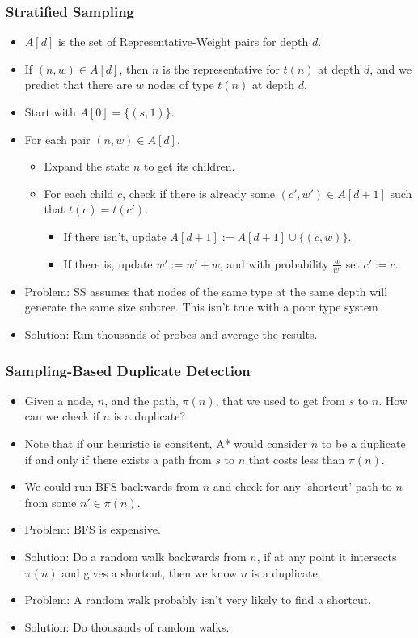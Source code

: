 \documentclass{beamer}
\begin{document}
\begin{frame}
  \frametitle{Stratified Sampling}
  \begin{itemize}
  \item \(A[d]\) is the set of Representative-Weight pairs for depth \(d\).
  \item If \((n,w) \in A[d]\), then \(n\) is the representative for \(t(n)\) at depth \(d\),
    and we predict that there are \(w\) nodes of type \(t(n)\) at depth \(d\).
  \item Start with \(A[0] = \{(s,1)\}\).
  \item For each pair \((n,w) \in A[d]\).
    \begin{itemize}
    \item Expand the state \(n\) to get its children.
    \item For each child \(c\), check if there is already some \((c',w') \in A[d+1]\) such that \(t(c) = t(c')\).
      \begin{itemize}
      \item If there isn't, update \(A[d+1] := A[d+1] \cup \{(c,w)\}\).
      \item If there is, update \(w' := w' + w\), and with probability \(\frac{w}{w'}\) set \(c' := c\).
      \end{itemize}
    \end{itemize}
  \item Problem: SS assumes that nodes of the same type at the same depth will generate the same size subtree. This isn't true with a poor type system
    \item Solution: Run thousands of probes and average the results.
  \end{itemize}
\end{frame}

\begin{frame}
  \frametitle{Sampling-Based Duplicate Detection}
  \begin{itemize}
  \item Given a node, \(n\), and the path, \(\pi(n)\), that we used to get from \(s\) to \(n\).
    How can we check if \(n\) is a duplicate?
  \item Note that if our heuristic is consitent,
    A* would consider \(n\) to be a duplicate if and only if there exists a path from \(s\) to \(n\) that costs less than \(\pi(n)\).
  \item We could run BFS backwards from \(n\) and check for any 'shortcut' path to \(n\) from some \(n' \in \pi(n)\).
  \item Problem: BFS is expensive.
  \item Solution: Do a random walk backwards from \(n\), if at any point it intersects \(\pi(n)\) and gives a
    shortcut, then we know \(n\) is a duplicate.
  \item Problem: A random walk probably isn't very likely to find a shortcut.
  \item Solution: Do thousands of random walks.
    
  \end{itemize}
\end{frame}
\end{document}
